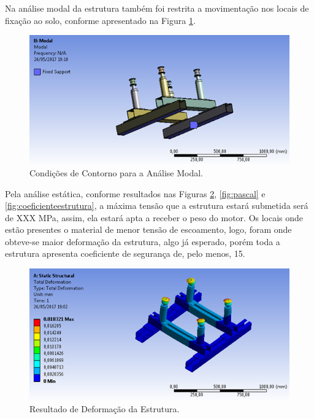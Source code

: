 Na análise modal da estrutura também foi restrita a movimentação nos locais de fixação ao solo, conforme apresentado na Figura \ref{fig:analisemodal}.

\begin{figure}[h!]
	\centering
	\includegraphics[keepaspectratio=true,scale= 0.8]{figuras/analise-modal.png}
	\caption{Condições de Contorno para a Análise Modal.}
	\label{fig:analisemodal}
\end{figure}


Pela análise estática, conforme resultados nas Figuras \ref{fig:deformacao}, \ref{fig:pascal} e \ref{fig:coeficienteestrutura}, a máxima tensão que a estrutura estará submetida será de XXX MPa, assim, ela estará apta a receber o peso do motor. Os locais onde estão presentes o material de menor tensão de escoamento, logo, foram onde obteve-se maior deformação da estrutura, algo já esperado, porém toda a estrutura apresenta coeficiente de segurança de, pelo menos, 15.

\begin{figure}[h!]
	\centering
	\includegraphics[keepaspectratio=true,scale= 0.8]{figuras/resultado-deformacao.png}
	\caption{Resultado de Deformação da Estrutura.}
	\label{fig:deformacao}
\end{figure}

